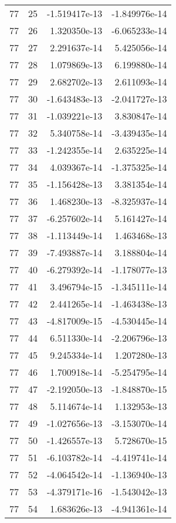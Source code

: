 \begin{tabular}{rrrr}
  77 &   25 & -1.519417e-13 & -1.849976e-14 \\
  77 &   26 &  1.320350e-13 & -6.065233e-14 \\
  77 &   27 &  2.291637e-14 &  5.425056e-14 \\
  77 &   28 &  1.079869e-13 &  6.199880e-14 \\
  77 &   29 &  2.682702e-13 &  2.611093e-14 \\
  77 &   30 & -1.643483e-13 & -2.041727e-13 \\
  77 &   31 & -1.039221e-13 &  3.830847e-14 \\
  77 &   32 &  5.340758e-14 & -3.439435e-14 \\
  77 &   33 & -1.242355e-14 &  2.635225e-14 \\
  77 &   34 &  4.039367e-14 & -1.375325e-14 \\
  77 &   35 & -1.156428e-13 &  3.381354e-14 \\
  77 &   36 &  1.468230e-13 & -8.325937e-14 \\
  77 &   37 & -6.257602e-14 &  5.161427e-14 \\
  77 &   38 & -1.113449e-14 &  1.463468e-13 \\
  77 &   39 & -7.493887e-14 &  3.188804e-14 \\
  77 &   40 & -6.279392e-14 & -1.178077e-13 \\
  77 &   41 &  3.496794e-15 & -1.345111e-14 \\
  77 &   42 &  2.441265e-14 & -1.463438e-13 \\
  77 &   43 & -4.817009e-15 & -4.530445e-14 \\
  77 &   44 &  6.511330e-14 & -2.206796e-13 \\
  77 &   45 &  9.245334e-14 &  1.207280e-13 \\
  77 &   46 &  1.700918e-14 & -5.254795e-14 \\
  77 &   47 & -2.192050e-13 & -1.848870e-15 \\
  77 &   48 &  5.114674e-14 &  1.132953e-13 \\
  77 &   49 & -1.027656e-13 & -3.153070e-14 \\
  77 &   50 & -1.426557e-13 &  5.728670e-15 \\
  77 &   51 & -6.103782e-14 & -4.419741e-14 \\
  77 &   52 & -4.064542e-14 & -1.136940e-13 \\
  77 &   53 & -4.379171e-16 & -1.543042e-13 \\
  77 &   54 &  1.683626e-13 & -4.941361e-14 \\

\end{tabular}
